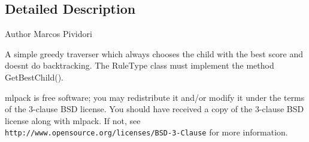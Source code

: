 \subsection{Detailed Description}
\begin{DoxyAuthor}{Author}
Marcos Pividori
\end{DoxyAuthor}
A simple greedy traverser which always chooses the child with the best score and doesn\textquotesingle{}t do backtracking. The Rule\+Type class must implement the method \textquotesingle{}Get\+Best\+Child()\textquotesingle{}.

mlpack is free software; you may redistribute it and/or modify it under the terms of the 3-\/clause B\+SD license. You should have received a copy of the 3-\/clause B\+SD license along with mlpack. If not, see {\tt http\+://www.\+opensource.\+org/licenses/\+B\+S\+D-\/3-\/\+Clause} for more information. 